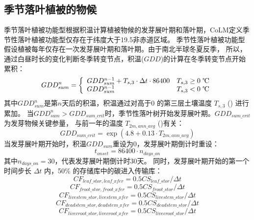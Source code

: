 \subsection{季节落叶植被的物候}\label{季节落叶植被的物候}
季节落叶植被功能型根据积温计算植被物候的发芽展叶期和落叶期，CoLM定义季节性落叶植被功能型仅存在于纬度大于19.5\textdegree 非赤道区域。
季节性落叶植被功能型假设植被每年仅存在一次发芽展叶期和落叶期。由于南北半球冬夏反季，
所以，通过白昼时长的变化判断冬季转变节点，积温($GDD$)的计算在冬季转变节点开始累积\citep{white1997continental}：
\begin{equation}
GDD _{sum}^{n}=\left\{\begin{array}{ll}GDD _{sum}^{n-1}+T_{s, 3} \cdot \Delta t \cdot 86400 & T_{s, 3} \geq \text{0 \textcelsius} \\ GDD _{sum}^{n-1} & T_{s, 3}< \text{0 \textcelsius}\end{array}\right.
\end{equation}
其中$GDD_{sum}^n$是第$n$天后的积温，积温通过对高于0 \textcelsius 的第三层土壤温度 $T_{s,3}$ (\textcelsius) 进行累加。
当$GDD_{sum}^n>{GDD}_{sum\_{crit}}$时，季节性落叶树开始发芽展叶期。${GDD}_{sum\_{crit}}$ 为发芽物候关键参量，
与前一年的温度 $T_{2m,ann\_{avg}}$ (\textcelsius)有关：
\begin{equation}
GDD _{sum\_{crit}}=\exp \left(4.8+0.13 \cdot T_{2 m, ann\_{avg}}\right)
\end{equation}
当发芽展叶期开始时，积温${GDD}_{sum}$重设为0，发芽展叶期倒计时重设：
\begin{equation}
t_{onset}=86400 \cdot n_{days\_on}
\end{equation}
其中$n_{days\_on}=30$，代表发芽展叶期倒计时30天。
同时，发芽展叶期开始的第一个时间步长 $\Delta t$ 内，50\% 的存储库中的碳进入传输库：
\begin{equation}
  CF_{leaf\_{stor},leaf\_{xfer}} = 0.5 CS_{leaf\_{stor}}/\Delta t
\end{equation}
\begin{equation}
  CF_{froot\_{stor},froot\_{xfer}} = 0.5  CS_{froot\_{stor}}/\Delta t
\end{equation}
\begin{equation}
  CF_{livestem\_{stor},livestem\_{xfer}} = 0.5  CS_{livestem\_{stor}}/\Delta t
\end{equation}
\begin{equation}
  CF_{deadstem\_{stor},deadstem\_{xfer}} = 0.5  CS_{deadstem\_{stor}}/\Delta t
\end{equation}
\begin{equation}
  CF_{livecroot\_{stor},livecroot\_{xfer}} = 0.5  CS_{livecroot\_{stor}}/\Delta t
\end{equation}
